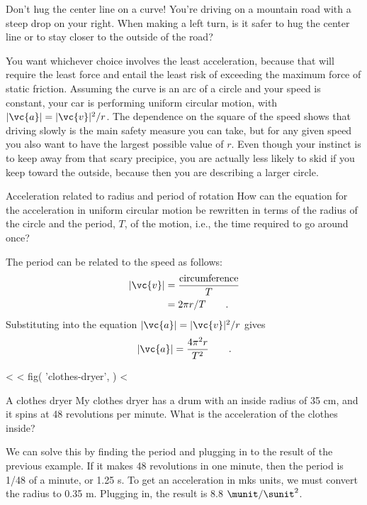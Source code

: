 \begin{eg}{Don't hug the center line on a curve!}
\egquestion You're driving on a mountain road with a steep
drop on your right. When making a left turn, is it safer to
hug the center line or to stay closer to the outside of the road?

\eganswer You want whichever choice involves the least
acceleration, because that will require the least force and
entail the least risk of exceeding the maximum force of
static friction. Assuming the curve is an arc of a circle
and your speed is constant, your car is performing uniform
circular motion, with $|\vc{a}|=|\vc{v}|^2/r$. The dependence on the
square of the speed shows that driving slowly is the main
safety measure you can take, but for any given speed you
also want to have the largest possible value of $r$. Even
though your instinct is to keep away from that scary
precipice, you are actually less likely to skid if you keep
toward the outside, because then you are describing a larger circle.
\end{eg}

\begin{eg}{Acceleration related to radius and period of rotation}\label{eg:accel-rt}
\egquestion How can the equation for the acceleration in
uniform circular motion be rewritten in terms of the radius
of the circle and the period, $T$, of the motion, i.e., the time required to go around once?

\eganswer The period can be related to the speed as follows:
\begin{align*}
        |\vc{v}|     &=  \frac{\text{circumference}}{T}  \\
             &=  2\pi r/T   \qquad   .
\end{align*}
Substituting into the equation $|\vc{a}|=|\vc{v}|^2/r$ gives
\begin{equation*}
        |\vc{a}|     =    \frac{4\pi^2r}{T^2} \qquad   .
\end{equation*}
\end{eg}

<%
<%
  fig(
    'clothes-dryer',
  )
<%

\begin{eg}{A clothes dryer}\label{eg:clothes-dryer}
\egquestion My clothes dryer has a drum with an inside radius
of 35 cm, and it spins at 48 revolutions per minute. What is
the acceleration of the clothes inside?

\eganswer We can solve this by finding the period and
plugging in to the result of the previous example. If it
makes 48 revolutions in one minute, then the period is 1/48
of a minute, or 1.25 s. To get an acceleration in mks
units, we must convert the radius to 0.35 m. Plugging in,
the result is 8.8 $\munit/\sunit^2$.
\end{eg}

